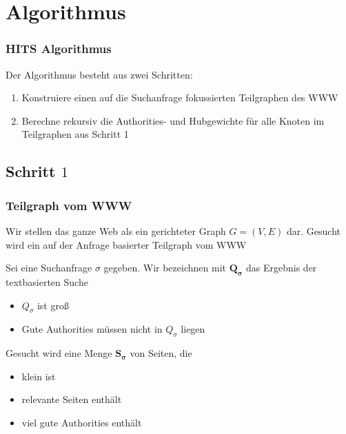 \documentclass[hyperref={pdfpagelabels=false}]{beamer}
\begin{document}
\section{Algorithmus}

\begin{frame}
\frametitle{HITS Algorithmus}
Der Algorithmus besteht aus zwei Schritten:
\begin{enumerate}
\item Konstruiere einen auf die Suchanfrage fokussierten Teilgraphen des WWW 
\item Berechne rekursiv die Authorities- und Hubgewichte für alle Knoten im Teilgraphen aus Schritt 1
\end{enumerate}

\end{frame}


\subsection{Schritt $1$} 
\begin{frame}
\frametitle{Teilgraph vom WWW}
Wir stellen das ganze Web als ein gerichteter Graph $G=(V,E)$ dar. Gesucht wird ein auf der Anfrage basierter Teilgraph vom WWW

\vspace{10pt}
Sei eine Suchanfrage $\sigma$ gegeben. Wir bezeichnen mit $\mathbf{Q_\sigma}$ das Ergebnis der textbasierten Suche
\begin{itemize}
\item $Q_\sigma$ ist groß
\item Gute Authorities müssen nicht in $Q_\sigma$ liegen
\end{itemize}

\vspace{10pt}

Gesucht wird eine Menge $\mathbf{S_\sigma}$ von Seiten, die
\begin{itemize}
\item klein ist
\item relevante Seiten enthält
\item viel gute Authorities enthält 
\end{itemize}
\end{frame}
\end{document}
